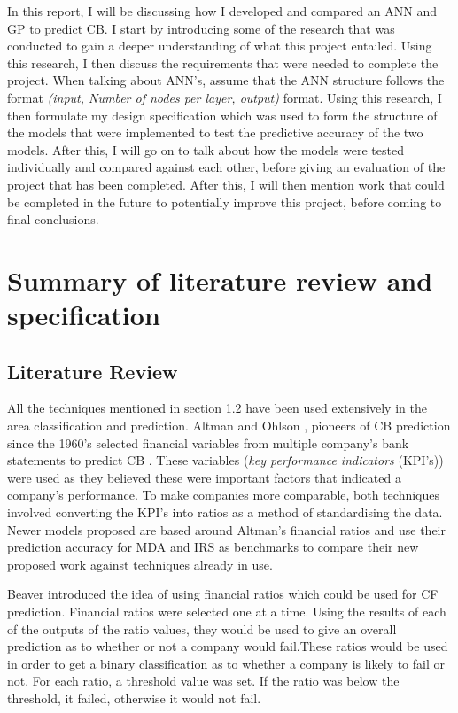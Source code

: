 \documentclass[11pt]{article}
\begin{document}
In this report, I will be discussing how I developed and compared an ANN and GP to predict CB.  I start by introducing some of the research that was conducted to gain a deeper understanding of what this project entailed. Using this research, I then discuss the requirements that were needed to complete the project. When talking about ANN's, assume that the ANN structure follows the format \textit{(input, Number of nodes per layer, output)} format. Using this research, I then formulate my design specification which was used to form the structure of the models that were implemented to test the predictive accuracy of the two models. After this, I will go on to talk about how the models were tested individually and compared against each other, before giving an evaluation of the project that has been completed. After this, I will then mention work that could be completed in the future to potentially improve this project, before coming to final conclusions. 
\section{Summary of literature review and specification}\label{sec:spec}
\subsection{Literature Review}
All the techniques mentioned in section 1.2 have been used extensively in the area classification and prediction. Altman and Ohlson , pioneers of CB prediction since the 1960's selected financial variables from multiple company's bank statements to predict CB \cite{?}. These variables (\textit{key performance indicators} (KPI's)) were used as they believed these were important factors that indicated a company's performance. To make companies more comparable, both techniques involved converting the KPI's into ratios as a method of standardising the data. Newer models proposed are based around Altman's financial ratios and use their prediction accuracy for MDA and IRS as benchmarks to compare their new proposed work against techniques already in use. 


Beaver introduced the idea of using financial ratios which could be used for CF prediction. Financial ratios were selected one at a time. Using the results of each of the outputs of the ratio values, they would be used to give an overall prediction as to whether or not a company would fail.These ratios would be used in order to get a binary classification as to whether a company is likely to fail or not. For each ratio, a threshold value was set. If the ratio was below the threshold, it failed, otherwise it would not fail.
\end{document}
